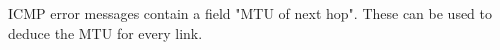 ICMP error messages contain a field "MTU of next hop". These can be used to deduce the MTU for every link.